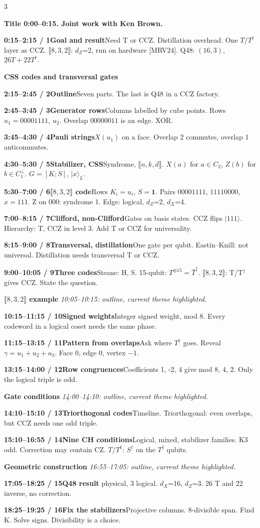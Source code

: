 \documentclass[10pt]{article}
\newcommand{\cue}[3]{\par\textbf{\color{Navy}#1\quad #2}\enspace #3}
\newcommand{\turn}[1]{\par\textbf{\color{Teal}#1}}
\begin{document}
\fontsize{10}{12}\selectfont\begin{multicols*}{3}\RaggedRight
\turn{Title 0:00--0:15. Joint work with Ken Brown.}
\cue{0:15--2:15 / 1}{Goal and result}{Need T or CCZ. Distillation overhead. One $T/T^\dagger$ layer as CCZ. $\llbracket8,3,2\rrbracket$: $d_Z$=2, run on hardware [MRV24]. Q48: $(16,3)$, $26T+22T^\dagger$.}
\turn{CSS codes and transversal gates}
\cue{2:15--2:45 / 2}{Outline}{Seven parts. The last is Q48 in a CCZ factory.}
\cue{2:45--3:45 / 3}{Generator rows}{Columns labelled by cube points. Rows $u_1=00001111$, $u_2$. Overlap $00000011$ is an edge. XOR.}
\cue{3:45--4:30 / 4}{Pauli strings}{$X(u_1)$ on a face. Overlap 2 commutes, overlap 1 anticommutes.}
\cue{4:30--5:30 / 5}{Stabilizer, CSS}{Syndrome, $\llbracket n,k,d\rrbracket$. $X(a)$ for $a\in C_2$, $Z(b)$ for $b\in C_1^\perp$. $G=[K;S]$, $|x\rangle_L$.}
\cue{5:30--7:00 / 6}{$\llbracket8,3,2\rrbracket$ code}{Rows $K_i=u_i$, $S=\mathbf 1$. Pairs $00001111$, $11110000$, $x=111$. Z on 000: syndrome 1. Edge: logical, $d_Z$=2, $d_X$=4.}
\cue{7:00--8:15 / 7}{Clifford, non-Clifford}{Gates on basis states. CCZ flips $|111\rangle$. Hierarchy: T, CCZ in level 3. Add T or CCZ for universality.}
\cue{8:15--9:00 / 8}{Transversal, distillation}{One gate per qubit. Eastin--Knill: not universal. Distillation needs transversal T or CCZ.}
\cue{9:00--10:05 / 9}{Three codes}{Steane: H, S. 15-qubit: $T^{\otimes15}=\bar T^\dagger$. $\llbracket8,3,2\rrbracket$: T/T$^\dagger$ gives CCZ. State the question.}
\turn{$\llbracket8,3,2\rrbracket$ example}
\textit{10:05--10:15: outline, current theme highlighted.}
\cue{10:15--11:15 / 10}{Signed weights}{Integer signed weight, mod 8. Every codeword in a logical coset needs the same phase.}
\cue{11:15--13:15 / 11}{Pattern from overlaps}{Ask where $T^\dagger$ goes. Reveal $\gamma=u_1+u_2+u_3$. Face 0, edge 0, vertex $-1$.}
\cue{13:15--14:00 / 12}{Row congruences}{Coefficients 1, -2, 4 give mod 8, 4, 2. Only the logical triple is odd.}
\columnbreak
\turn{Gate conditions}
\textit{14:00--14:10: outline, current theme highlighted.}
\cue{14:10--15:10 / 13}{Triorthogonal codes}{Timeline. Triorthogonal: even overlaps, but CCZ needs one odd triple.}
\cue{15:10--16:55 / 14}{Nine CH conditions}{Logical, mixed, stabilizer families. K3 odd. Correction may contain CZ. $T/T^\dagger$: $S^\dagger$ on the $T^\dagger$ qubits.}
\turn{Geometric construction}
\textit{16:55--17:05: outline, current theme highlighted.}
\cue{17:05--18:25 / 15}{Q48 result}{48 physical, 3 logical. $d_X$=16, $d_Z$=3. 26 T and 22 inverse, no correction.}
\cue{18:25--19:25 / 16}{Fix the stabilizers}{Projective columns. 8-divisible span. Find K. Solve signs. Divisibility is a choice.}

\end{multicols*}
\end{document}
